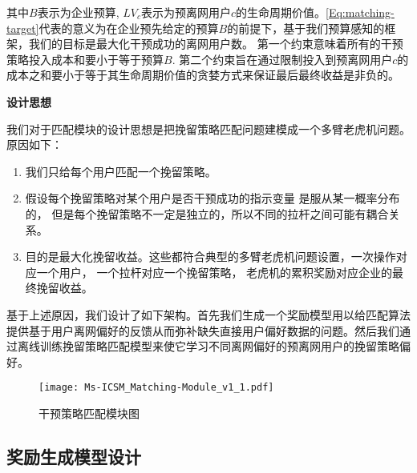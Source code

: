 其中$B$表示为企业预算,  $LV_{c}$表示为预离网用户$c$的生命周期价值。\eqref{Eq:matching-target}代表的意义为在企业预先给定的预算$B$的前提下，基于我们预算感知的框架，我们的目标是最大化干预成功的离网用户数。 第一个约束意味着所有的干预策略投入成本和要小于等于预算$B$. 第二个约束旨在通过限制投入到预离网用户$c$的成本之和要小于等于其生命周期价值的贪婪方式来保证最后最终收益是非负的。\par
\textbf{设计思想}\par
	我们对于匹配模块的设计思想是把挽留策略匹配问题建模成一个多臂老虎机问题。
	原因如下：
\begin{enumerate}	
	\item 我们只给每个用户匹配一个挽留策略。
	\item 假设每个挽留策略对某个用户是否干预成功的指示变量 是服从某一概率分布的， 但是每个挽留策略不一定是独立的，所以不同的拉杆之间可能有耦合关系。 
	\item 目的是最大化挽留收益。这些都符合典型的多臂老虎机问题设置，一次操作对应一个用户， 一个拉杆对应一个挽留策略， 老虎机的累积奖励对应企业的最终挽留收益。
\end{enumerate}
	基于上述原因，我们设计了如下架构。首先我们生成一个奖励模型用以给匹配算法提供基于用户离网偏好的反馈从而弥补缺失直接用户偏好数据的问题。然后我们通过离线训练挽留策略匹配模型来使它学习不同离网偏好的预离网用户的挽留策略偏好。

\begin{figure}[hbt]
	\centering
	\texttt{[image: Ms-ICSM\_Matching-Module\_v1\_1.pdf]}
	\caption{干预策略匹配模块图}
	\label{Fig:Matching-Module}
\end{figure}

\subsection{奖励生成模型设计}


